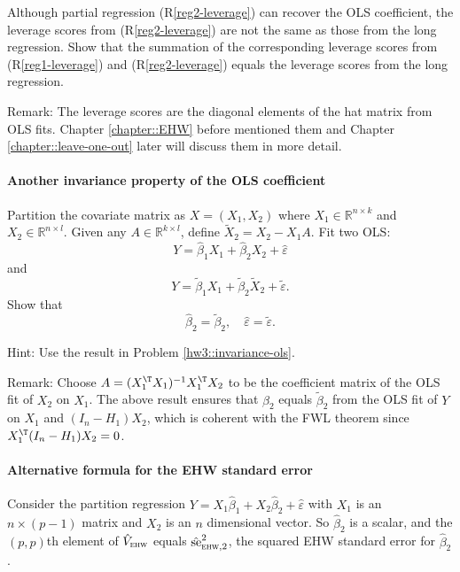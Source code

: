 Although partial regression (R\ref{reg2-leverage}) can recover the OLS coefficient, the leverage scores from  (R\ref{reg2-leverage}) are not the same as those from the long regression. Show that the summation of the corresponding leverage scores from (R\ref{reg1-leverage}) and (R\ref{reg2-leverage}) equals the leverage scores from the long regression. 


Remark: The leverage scores are the diagonal elements of the hat matrix from OLS fits. Chapter \ref{chapter::EHW} before mentioned them and Chapter \ref{chapter::leave-one-out} later will discuss them in more detail. 



\paragraph{Another invariance property of the OLS coefficient}\label{hw7::invariance-ols-fwl}


Partition the covariate matrix as $X = (X_1, X_2)$ where $X_1 \in \mathbb{R}^{n\times k}$ and $X_2 \in \mathbb{R}^{n\times l}$. Given any $A\in \mathbb{R}^{k\times l}$, define $\tilde{X}_2 = X_2 - X_1A$. Fit two OLS:
$$
Y = \hat{\beta}_1 X_1 + \hat{\beta}_2 X_2 + \hat\varepsilon
$$
and
$$
Y = \tilde{\beta}_1 X_1 + \tilde{\beta}_2 \tilde{X}_2 + \tilde\varepsilon .
$$
Show that
$$
\hat{\beta}_2 = \tilde{\beta}_2, \quad \hat\varepsilon = \tilde\varepsilon.
$$

Hint: Use the result in Problem \ref{hw3::invariance-ols}. 

Remark: Choose $A = (X_1^{\T}X_1)^{-1} X_1^{\T} X_2$ to be the coefficient matrix of the OLS fit of $X_2$ on $X_1$. The above result ensures that $\hat{\beta}_2$ equals $\tilde{\beta}_2$ from the OLS fit of $Y$ on  $X_1$ and $(I_n-H_1)X_2$, which is coherent with the FWL theorem since $X_1^{\T} (I_n-H_1)X_2 = 0$.




\paragraph{Alternative formula for the EHW standard error}\label{hw7::alternative-ehw-se}


Consider the partition regression $Y = X_1 \hat\beta_1 + X_2 \hat\beta_2  + \hat{\varepsilon}$ with $X_1$ is an $n\times (p-1)$ matrix and  $X_2 $ is an $n$ dimensional vector. So $ \hat\beta_2$ is a scalar, and the $(p,p)$th element of $\hat{V}_\textsc{ehw}$ equals $\hat{\text{se}}_{\textsc{ehw}, 2}^2$, the squared EHW standard error for $ \hat\beta_2$. 

